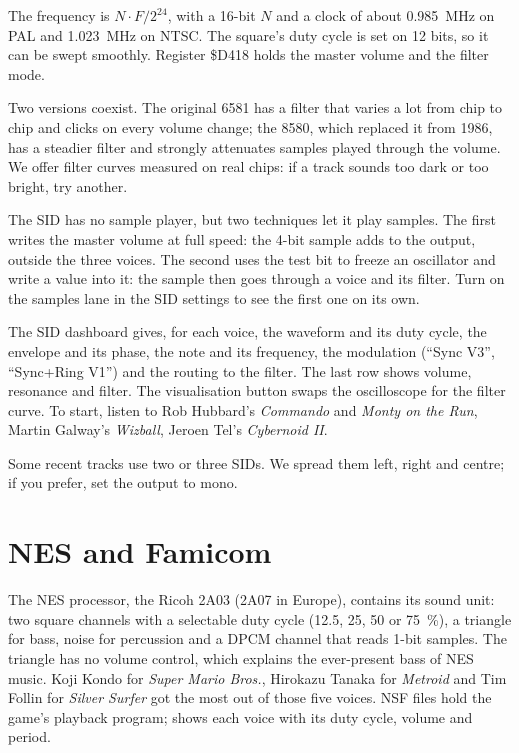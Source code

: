 The frequency is $N \cdot F / 2^{24}$, with a 16-bit $N$ and a clock of about 0.985~MHz on PAL and 1.023~MHz on NTSC.
The square's duty cycle is set on 12 bits, so it can be swept smoothly. Register \$D418 holds the master volume and
the filter mode.

Two versions coexist. The original 6581 has a filter that varies a lot from chip to chip and clicks on every volume
change; the 8580, which replaced it from 1986, has a steadier filter and strongly attenuates samples played through
the volume. We offer filter curves measured on real chips: if a track sounds too dark or too bright, try another.

The SID has no sample player, but two techniques let it play samples. The first writes the master volume at full
speed: the 4-bit sample adds to the output, outside the three voices. The second uses the test bit to freeze an
oscillator and write a value into it: the sample then goes through a voice and its filter. Turn on the samples lane
in the SID settings to see the first one on its own.

The SID dashboard gives, for each voice, the waveform and its duty cycle, the envelope and its phase, the note and
its frequency, the modulation (``Sync V3'', ``Sync+Ring V1'') and the routing to the filter. The last row shows
volume, resonance and filter. The visualisation button swaps the oscilloscope for the filter curve. To start, listen
to Rob Hubbard's \emph{Commando} and \emph{Monty on the Run}, Martin Galway's \emph{Wizball}, Jeroen Tel's
\emph{Cybernoid II}.

Some recent tracks use two or three SIDs. We spread them left, right and centre; if you prefer, set the output to
mono.

\section{NES and Famicom}
The NES processor, the Ricoh 2A03 (2A07 in Europe), contains its sound unit: two square channels with a selectable
duty cycle (12.5, 25, 50 or 75~\%), a triangle for bass, noise for percussion and a DPCM channel that reads 1-bit
samples. The triangle has no volume control, which explains the ever-present bass of NES music. Koji Kondo for
\emph{Super Mario Bros.}, Hirokazu Tanaka for \emph{Metroid} and Tim Follin for \emph{Silver Surfer} got the most
out of those five voices. NSF files hold the game's playback program; \soft shows each voice with its duty cycle,
volume and period.

